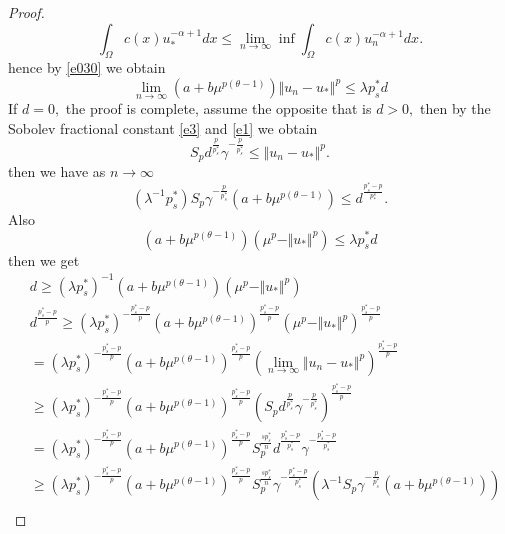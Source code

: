 \documentclass[10pt,twoside,reqno,centertags,draft]{amsart}
\begin{document}
\begin{proof}
\begin{equation}
\int_{\Omega} c(x)u_*^{-\alpha +1}dx \leq \lim_{n \to \infty}\inf\int_{\Omega} c(x)u_n^{-\alpha +1}dx.
\end{equation}
hence by \ref{e030} we obtain
\begin{equation}
\lim_{n \to \infty}(a +b\mu^{p(\theta -1)})\Vert u_n -u_*\Vert^{p} \leq \lambda p_s^* d
\end{equation}
If $ d =0,$ the proof is complete, assume the opposite that is $ d >0,$ then by the Sobolev fractional constant \ref{e3} and \ref{e1} we obtain
\begin{equation}
S_{p}d^{\frac{p}{p_s^*}}\gamma^{-\frac{p}{p_s^*}} \leq \Vert u_n -u_*\Vert^{p}.
\end{equation}
then we have as $ n \to \infty$ 
\begin{equation}
(\lambda^{-1} p_s^*) S_{p} \gamma^{-\frac{p}{p_s^*}}(a +b\mu^{p(\theta -1)}) \leq d^{\frac{p_s^* -p}{p^s_*}}.
\end{equation}
Also
\begin{equation}
(a +b\mu^{p(\theta -1)})(\mu^{p} -\Vert u_*\Vert^{p}) \leq \lambda p_s^* d
\end{equation}
then we get 
\begin{equation*}
\begin{aligned}
 & d \geq (\lambda p_s^*)^{-1} (a +b\mu^{p(\theta -1)})(\mu^{p} -\Vert u_*\Vert^{p})\\
 & d^{\frac{p_s^* -p}{p}} \geq (\lambda p_s^*)^{-\frac{p_s^* -p}{p}} (a +b\mu^{p(\theta -1)})^{\frac{p_s^* -p}{p}}(\mu^{p} -\Vert u_*\Vert^{p})^{\frac{p_s^* -p}{p}}\\
 & =(\lambda p_s^*)^{-\frac{p_s^* -p}{p}} (a +b\mu^{p(\theta -1)})^{\frac{p_s^* -p}{p}}\left( \lim_{n \to \infty }\Vert u_n -u_*\Vert^{p}\right)^{\frac{p_s^* -p}{p}}\\
 & \geq (\lambda p_s^*)^{-\frac{p_s^* -p}{p}} (a +b\mu^{p(\theta -1)})^{\frac{p_s^* -p}{p}}\left( S_{p}d^{\frac{p}{p_s^*}}\gamma^{-\frac{p}{p_s^*}}\right)^{\frac{p_s^* -p}{p}}\\
 & =(\lambda p_s^*)^{-\frac{p_s^* -p}{p}}(a +b\mu^{p(\theta -1)})^{\frac{p_s^* -p}{p}}S_{p}^{\frac{s p_s^*}{n}} d^{\frac{p_s^* -p}{p^*_s}}\gamma^{-\frac{p_s^* -p}{p^*_s}}\\
 & \geq (\lambda p_s^*)^{-\frac{p_s^* -p}{p}}(a +b\mu^{p(\theta -1)})^{\frac{p_s^* -p}{p}}S_{p}^{\frac{s p_s^*}{n}}\gamma^{-\frac{p_s^* -p}{p^*_s}}\left( \lambda^{-1} S_{p} \gamma^{-\frac{p}{p_s^*}}(a +b\mu^{p(\theta -1)})\right)\\

\end{aligned}
\end{equation*}
\end{proof}
\end{document}
